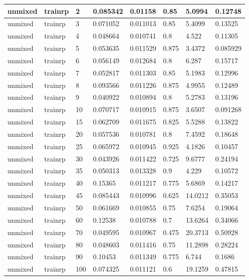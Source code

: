 \begin{longtable}{llllllll}
unmixed & trainrp & 2 & 0.085342 & 0.01158 & 0.85 & 5.0994 & 0.12748 \\ \hline 
unmixed & trainrp & 3 & 0.071052 & 0.011013 & 0.85 & 5.4099 & 0.13525 \\ \hline 
unmixed & trainrp & 4 & 0.048664 & 0.010741 & 0.8 & 4.522 & 0.11305 \\ \hline 
unmixed & trainrp & 5 & 0.053635 & 0.011529 & 0.875 & 3.4372 & 0.085929 \\ \hline 
unmixed & trainrp & 6 & 0.056149 & 0.012684 & 0.8 & 6.287 & 0.15717 \\ \hline 
unmixed & trainrp & 7 & 0.052817 & 0.011303 & 0.85 & 5.1983 & 0.12996 \\ \hline 
unmixed & trainrp & 8 & 0.093566 & 0.011226 & 0.875 & 4.9955 & 0.12489 \\ \hline 
unmixed & trainrp & 9 & 0.040922 & 0.010894 & 0.8 & 5.2783 & 0.13196 \\ \hline 
unmixed & trainrp & 10 & 0.070717 & 0.010915 & 0.875 & 3.6507 & 0.091268 \\ \hline 
unmixed & trainrp & 15 & 0.062709 & 0.011675 & 0.825 & 5.5288 & 0.13822 \\ \hline 
unmixed & trainrp & 20 & 0.057536 & 0.010781 & 0.8 & 7.4592 & 0.18648 \\ \hline 
unmixed & trainrp & 25 & 0.065972 & 0.010945 & 0.925 & 4.1826 & 0.10457 \\ \hline 
unmixed & trainrp & 30 & 0.043926 & 0.011422 & 0.725 & 9.6777 & 0.24194 \\ \hline 
unmixed & trainrp & 35 & 0.050313 & 0.013328 & 0.9 & 4.229 & 0.10572 \\ \hline 
unmixed & trainrp & 40 & 0.15365 & 0.011217 & 0.775 & 5.6869 & 0.14217 \\ \hline 
unmixed & trainrp & 45 & 0.085443 & 0.010996 & 0.625 & 14.0212 & 0.35053 \\ \hline 
unmixed & trainrp & 50 & 0.061669 & 0.010855 & 0.75 & 7.6254 & 0.19064 \\ \hline 
unmixed & trainrp & 60 & 0.12538 & 0.010788 & 0.7 & 13.6264 & 0.34066 \\ \hline 
unmixed & trainrp & 70 & 0.049595 & 0.010967 & 0.475 & 20.3713 & 0.50928 \\ \hline 
unmixed & trainrp & 80 & 0.048603 & 0.011416 & 0.75 & 11.2898 & 0.28224 \\ \hline 
unmixed & trainrp & 90 & 0.10453 & 0.011349 & 0.775 & 6.744 & 0.1686 \\ \hline 
unmixed & trainrp & 100 & 0.074325 & 0.011121 & 0.6 & 19.1259 & 0.47815 \\ \hline 

\end{longtable}
